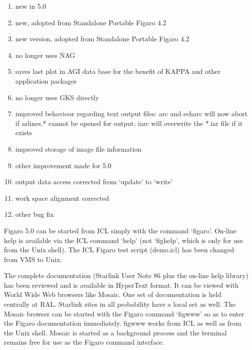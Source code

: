\documentclass[11pt,twoside]{article}
\begin{document}

\begin{enumerate}
\item new in 5.0                                                 %
\item new, adopted from Standalone Portable Figaro 4.2           %
\item new version, adopted from Standalone Portable Figaro 4.2   %
\item no longer uses NAG                                         %
\item saves last plot in AGI data base for the benefit of        %
   KAPPA and other application packages
\item no longer uses GKS directly                                %
\item improved behaviour regarding text output files:            %
   arc and echarc will now abort if arlines.* cannot be opened for
   output; iarc will overwrite the *.iar file if it exists
\item improved storage of image file information                 %
\item other improvement made for 5.0                             %
\item output data access corrected from `update' to `write'      %
\item work space alignment corrected                             %
\item other bug fix                                              %
\end{enumerate}


   Figaro 5.0 can be started from ICL simply with the command `figaro'.
   On-line help is available via the ICL command `help' (not `fighelp',
   which is only for use from the Unix shell). The ICL Figaro test
   script (demo.icl) has been changed from VMS to Unix.


   The complete documentation (Starlink User Note 86 plus the on-line
   help library) has been reviewed and is available in
   HyperText format. It can be viewed with World Wide Web browsers like
   Mosaic. One set of documentation is held centrally at RAL. Starlink
   sites in all probability have a local set as well. The Mosaic browser
   can be started with the Figaro command `figwww' so as to enter the
   Figaro documentation immediately. figwww works from ICL as well as
   from the Unix shell. Mosaic is started as a background process and
   the terminal remains free for use as the Figaro command interface.
\end{document}
